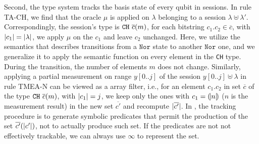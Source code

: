 Second, the type system tracks the basis state of every qubit in sessions. In rule \textsc{TA-CH}, we find that the oracle $\mu$ is applied on $\lambda$ belonging to a session $\lambda \uplus \lambda'$. Correspondingly, the session's type is $\texttt{CH}~{\overline{c}(m)}$, for each bitstring $c_1.c_2\in \overline{c}$, with $|c_1|=|\lambda|$, we apply $\mu$ on the $c_1$ and leave $c_2$ unchanged.
Here, we utilize the \oqasm semantics that describes transitions from a $\texttt{Nor}$ state to another $\texttt{Nor}$ one, and we generalize it to apply the semantic function on every element in the \texttt{CH} type.
During the transition, the number of elements $m$ does not change.
Similarly, applying a partial measurement on range $y[0..j]$ of the session $y[0..j]\uplus\lambda$ in rule \textsc{TMEA-N}
can be viewed as a array filter, i.e., for an element $c_1.c_2$ in set $\overline{c}$ of the type $\texttt{CH}~{\overline{c}(m)}$, with $|c_1|=j$, we keep only the ones with $c_1=(\!| n |\!)$ ($n$ is the measurement result) in the new set $\overline{c'}$ and recompute $|\overline{c'}|$. In \qafny, the tracking procedure is to generate symbolic predicates that permit the production of the set $\overline{c'}(|c'|)$, not to actually produce such set. If the predicates are not not effectively trackable, we can always use $\infty$ to represent the set.


